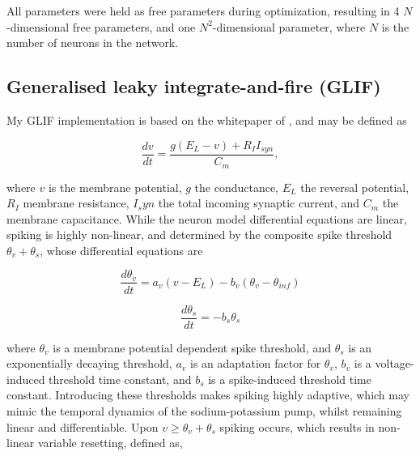 \documentclass[mphil,deptreport,ianc]{infthesis} %
\begin{document}

All parameters were held as free parameters during optimization, resulting in 4 $N$-dimensional free parameters, and one $N^2$-dimensional parameter, where $N$ is the number of neurons in the network. 


\subsection{Generalised leaky integrate-and-fire (GLIF)}

My GLIF implementation is based on the whitepaper of \cite{allen_glif_white_paper}, and may be defined as

\begin{equation}
    \frac{dv}{dt} = \frac{g (E_L - v) + R_I I_{syn}}{C_m},
\end{equation}

where $v$ is the membrane potential, $g$ the conductance, $E_L$ the reversal potential, $R_I$ membrane resistance, $I_syn$ the total incoming synaptic current, and $C_m$ the membrane capacitance.
While the neuron model differential equations are linear, spiking is highly non-linear, and determined by the composite spike threshold $\theta_v + \theta_s$, whose differential equations are

\begin{equation}
    \frac{d\theta_v}{dt} = a_v (v - E_L) - b_v (\theta_v - \theta_{inf})
\end{equation}

\begin{equation}
    \frac{d\theta_s}{dt} = - b_s \theta_s
\end{equation}

where $\theta_v$ is a membrane potential dependent spike threshold, and $\theta_s$ is an exponentially decaying threshold, $a_v$ is an adaptation factor for $\theta_v$, $b_v$ is a voltage-induced threshold time constant, and $b_s$ is a spike-induced threshold time constant.
Introducing these thresholds makes spiking highly adaptive, which may mimic the temporal dynamics of the sodium-potassium pump, whilst remaining linear and differentiable.
Upon $v \geq \theta_v + \theta_s$ spiking occurs, which results in non-linear variable resetting, defined as,
\end{document}
